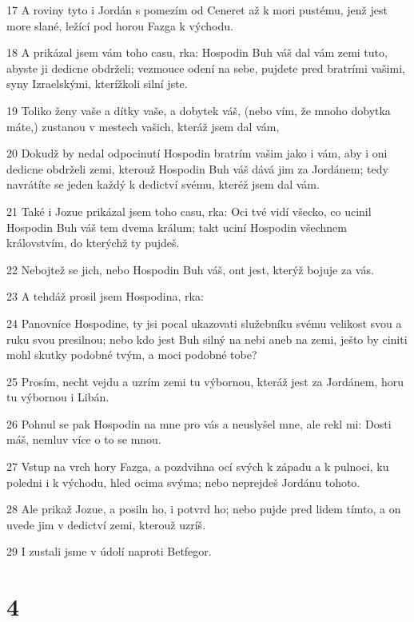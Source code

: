 \par 17 A roviny tyto i Jordán s pomezím od Ceneret až k mori pustému, jenž jest more slané, ležící pod horou Fazga k východu.
\par 18 A prikázal jsem vám toho casu, rka: Hospodin Buh váš dal vám zemi tuto, abyste ji dedicne obdrželi; vezmouce odení na sebe, pujdete pred bratrími vašimi, syny Izraelskými, kterížkoli silní jste.
\par 19 Toliko ženy vaše a dítky vaše, a dobytek váš, (nebo vím, že mnoho dobytka máte,) zustanou v mestech vašich, kteráž jsem dal vám,
\par 20 Dokudž by nedal odpocinutí Hospodin bratrím vašim jako i vám, aby i oni dedicne obdrželi zemi, kterouž Hospodin Buh váš dává jim za Jordánem; tedy navrátíte se jeden každý k dedictví svému, kteréž jsem dal vám.
\par 21 Také i Jozue prikázal jsem toho casu, rka: Oci tvé vidí všecko, co ucinil Hospodin Buh váš tem dvema králum; takt uciní Hospodin všechnem královstvím, do kterýchž ty pujdeš.
\par 22 Nebojtež se jich, nebo Hospodin Buh váš, ont jest, kterýž bojuje za vás.
\par 23 A tehdáž prosil jsem Hospodina, rka:
\par 24 Panovníce Hospodine, ty jsi pocal ukazovati služebníku svému velikost svou a ruku svou presilnou; nebo kdo jest Buh silný na nebi aneb na zemi, ješto by ciniti mohl skutky podobné tvým, a moci podobné tobe?
\par 25 Prosím, necht vejdu a uzrím zemi tu výbornou, kteráž jest za Jordánem, horu tu výbornou i Libán.
\par 26 Pohnul se pak Hospodin na mne pro vás a neuslyšel mne, ale rekl mi: Dosti máš, nemluv více o to se mnou.
\par 27 Vstup na vrch hory Fazga, a pozdvihna ocí svých k západu a k pulnoci, ku poledni i k východu, hled ocima svýma; nebo neprejdeš Jordánu tohoto.
\par 28 Ale prikaž Jozue, a posiln ho, i potvrd ho; nebo pujde pred lidem tímto, a on uvede jim v dedictví zemi, kterouž uzríš.
\par 29 I zustali jsme v údolí naproti Betfegor.

\chapter{4}

